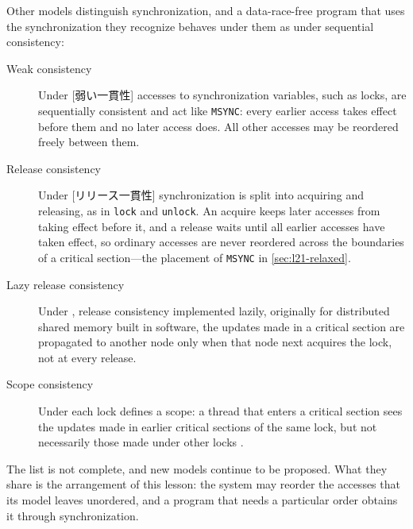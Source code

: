 \documentclass[../main.tex]{subfiles}
\begin{document}
Other models distinguish synchronization, and a data-race-free program that
uses the synchronization they recognize behaves under them as under
sequential consistency:
\begin{description}
  \item[Weak consistency] Under [弱い一貫性] accesses to
    synchronization variables, such as locks, are sequentially consistent and
    act like \texttt{MSYNC}: every earlier access takes effect before them and
    no later access does.  All other accesses may be reordered freely between
    them.
  \item[Release consistency] Under [リリース一貫性]
    synchronization is split into acquiring and releasing, as in
    \texttt{lock} and \texttt{unlock}.  An acquire keeps later accesses from taking effect before
    it, and a release waits until all earlier accesses have taken effect, so
    ordinary accesses are never reordered across the boundaries of a critical
    section---the placement of \texttt{MSYNC} in \cref{sec:l21-relaxed}.
  \item[Lazy release consistency] Under ,
    release consistency implemented lazily, originally for distributed shared
    memory built in software, the updates made
    in a critical section are propagated to another node only when that node
    next acquires the lock, not at every release.
  \item[Scope consistency] Under 
    each lock defines a scope: a thread that enters a critical section sees
    the updates made in earlier
    critical sections of the same lock, but not necessarily those made under
    other locks \cite{iftode1996}.
\end{description}
\noindent The list is not complete, and new models continue to be proposed.  What they
share is the arrangement of this lesson: the system may reorder the accesses
that its model leaves unordered, and a program that needs a particular order
obtains it through synchronization.
\end{document}
